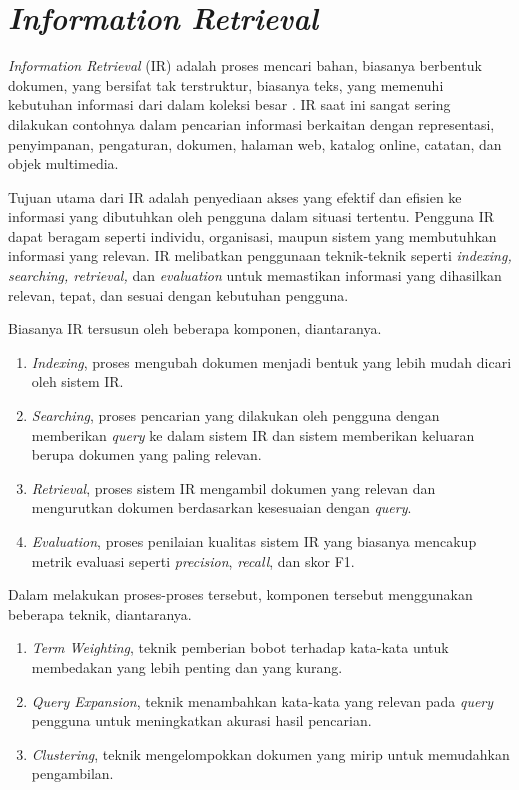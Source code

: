 \section{\textit{Information Retrieval}}
\textit{Information Retrieval} (IR) adalah proses mencari bahan, biasanya berbentuk dokumen, yang bersifat tak terstruktur, biasanya teks, yang memenuhi kebutuhan informasi dari dalam koleksi besar \parencite{inforetrieval}. IR saat ini sangat sering dilakukan contohnya dalam pencarian informasi berkaitan dengan representasi, penyimpanan, pengaturan, dokumen, halaman web, katalog online, catatan, dan objek multimedia. 

Tujuan utama dari IR adalah penyediaan akses yang efektif dan efisien ke informasi yang dibutuhkan oleh pengguna dalam situasi tertentu. Pengguna IR dapat beragam seperti individu, organisasi, maupun sistem yang membutuhkan informasi yang relevan. IR melibatkan penggunaan teknik-teknik seperti \textit{indexing, searching, retrieval,} dan \textit{evaluation} untuk memastikan informasi yang dihasilkan relevan, tepat, dan sesuai dengan kebutuhan pengguna.

Biasanya IR tersusun oleh beberapa komponen, diantaranya.
\begin{enumerate}
    \item \textit{Indexing}, proses mengubah dokumen menjadi bentuk yang lebih mudah dicari oleh sistem IR.
    \item \textit{Searching}, proses pencarian yang dilakukan oleh pengguna dengan memberikan \textit{query} ke dalam sistem IR dan sistem memberikan keluaran berupa dokumen yang paling relevan.
    \item \textit{Retrieval}, proses sistem IR mengambil dokumen yang relevan dan mengurutkan dokumen berdasarkan kesesuaian dengan \textit{query}.
    \item \textit{Evaluation}, proses penilaian kualitas sistem IR yang biasanya mencakup metrik evaluasi seperti \textit{precision}, \textit{recall}, dan skor F1. 
\end{enumerate}

Dalam melakukan proses-proses tersebut, komponen tersebut menggunakan beberapa teknik, diantaranya.
\begin{enumerate}
    \item \textit{Term Weighting}, teknik pemberian bobot terhadap kata-kata untuk membedakan yang lebih penting dan yang kurang.
    \item \textit{Query Expansion}, teknik menambahkan kata-kata yang relevan pada \textit{query} pengguna untuk meningkatkan akurasi hasil pencarian.
    \item \textit{Clustering}, teknik mengelompokkan dokumen yang mirip untuk memudahkan pengambilan.
\end{enumerate}